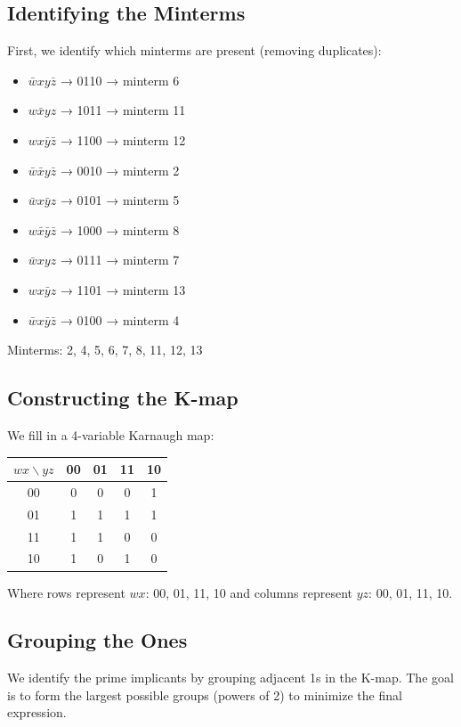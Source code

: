 \documentclass[11pt]{article}
\begin{document}
\subsection{Identifying the Minterms}
\label{sec:org2c53fee}
First, we identify which minterms are present (removing duplicates):
\begin{itemize}
\item \(\bar{w}xy\bar{z}\) → 0110 → minterm 6
\item \(w\bar{x}yz\) → 1011 → minterm 11
\item \(wx\bar{y}\bar{z}\) → 1100 → minterm 12
\item \(\bar{w}\bar{x}y\bar{z}\) → 0010 → minterm 2
\item \(\bar{w}x\bar{y}z\) → 0101 → minterm 5
\item \(w\bar{x}\bar{y}\bar{z}\) → 1000 → minterm 8
\item \(\bar{w}xyz\) → 0111 → minterm 7
\item \(wx\bar{y}z\) → 1101 → minterm 13
\item \(\bar{w}x\bar{y}\bar{z}\) → 0100 → minterm 4
\end{itemize}

Minterms: 2, 4, 5, 6, 7, 8, 11, 12, 13
\subsection{Constructing the K-map}
\label{sec:org934a582}
We fill in a 4-variable Karnaugh map:

\begin{center}
\begin{tabular}{|c|c|c|c|c|}
\hline
$wx \backslash yz$ & 00 & 01 & 11 & 10 \\
\hline
00 & 0 & 0 & 0 & 1 \\
01 & 1 & 1 & 1 & 1 \\
11 & 1 & 1 & 0 & 0 \\
10 & 1 & 0 & 1 & 0 \\
\hline
\end{tabular}
\end{center}

Where rows represent \(wx\): 00, 01, 11, 10 and columns represent \(yz\): 00, 01, 11, 10.

\newpage
\subsection{Grouping the Ones}
\label{sec:org51e0bdb}
We identify the prime implicants by grouping adjacent 1s in the K-map. The goal is to form the largest possible groups (powers of 2) to minimize the final expression.
\end{document}
